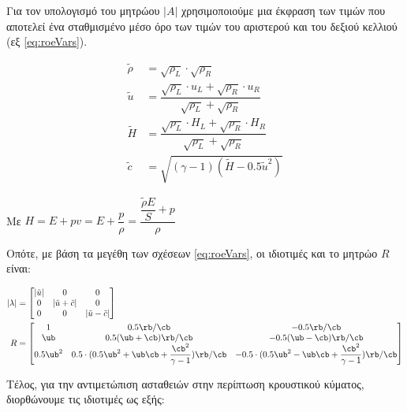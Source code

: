 Για τον υπολογισμό του μητρώου $|A|$ χρησιμοποιούμε μια έκφραση των τιμών που αποτελεί ένα σταθμισμένο μέσο όρο των τιμών του αριστερού και του δεξιού κελλιού (εξ \ref{eq:roeVars}).

\begin{equation}
   \begin{aligned}
     \tilde{\rho} &= \sqrt{\rho_L}\cdot\sqrt{\rho_R}\\
     \tilde{u} &= \dfrac{\sqrt{\rho_L}\cdot u_L+\sqrt{\rho_R}\cdot u_R}{\sqrt{\rho_L}+\sqrt{\rho_R}}\\
     \tilde{H} &= \dfrac{\sqrt{\rho_L}\cdot H_L+\sqrt{\rho_R}\cdot H_R}{\sqrt{\rho_L}+\sqrt{\rho_R}}\\
     \tilde{c} &= \sqrt{(\gamma-1)(\tilde{H}-0.5\tilde{u}^2)}
   \end{aligned} 
    \label{eq:roeVars}
\end{equation}

Με $H = E + pv = E + \dfrac{p}{\rho} = \dfrac{\dfrac{\tilde{\rho} E}{S} + p}{\rho}$
\vspace{6pt}


Οπότε, με βάση τα μεγέθη των σχέσεων \ref{eq:roeVars}, οι ιδιοτιμές και το μητρώο $R$ είναι:

\begin{equation}
   \begin{aligned}
        |\lambda| &= \begin{bmatrix}
            |\tilde{u}| & 0 & 0\\
            0 & |\tilde{u} + \tilde{c}| & 0\\
            0 & 0 & |\tilde{u} - \tilde{c}|
        \end{bmatrix}\\
        R &= \begin{bmatrix}
            1 & 0.5\rb/\cb & -0.5\rb/\cb\\
            \ub & 0.5(\ub+\cb)\rb/\cb & -0.5(\ub-\cb)\rb/\cb\\
            0.5\ub^2 & 0.5\cdot(0.5\ub^2+\ub\cb+\dfrac{\cb^2}{\gamma-1})\rb/\cb & -0.5\cdot(0.5\ub^2-\ub\cb+\dfrac{\cb^2}{\gamma-1})\rb/\cb\\
            \end{bmatrix}
   \end{aligned} 
    \label{eq:roeMat}
\end{equation}

Τέλος, για την αντιμετώπιση ασταθειών στην περίπτωση κρουστικού κύματος, διορθώνουμε τις ιδιοτιμές ως εξής:

